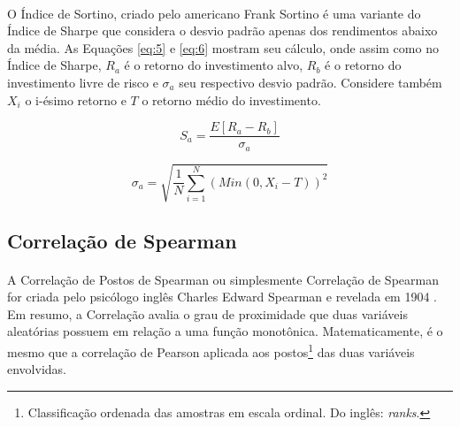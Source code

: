 \paragraph{} O Índice de Sortino, criado pelo americano Frank Sortino \cite{rollinger2013sortino} é uma variante do Índice de Sharpe que considera o desvio padrão apenas dos rendimentos abaixo da média. As Equações \ref{eq:5} e \ref{eq:6} mostram seu cálculo, onde assim como no Índice de Sharpe, \begin{math}R_a\end{math} é o retorno do investimento alvo, \begin{math}R_b\end{math} é o retorno do investimento livre de risco e \begin{math}\sigma_a\end{math} seu respectivo desvio padrão. Considere também \begin{math}X_i\end{math} o i-ésimo retorno e \begin{math}T\end{math} o retorno médio do investimento.

\begin{equation} \label{eq:5}
    S_a = \frac{E[R_a - R_b]}{\sigma_a}
\end{equation}

\begin{equation} \label{eq:6}
    \sigma_a = \sqrt{ \frac{1}{N} \sum_{i=1}^{N} (Min(0, X_i-T))^2}
\end{equation}



\FloatBarrier
\subsection{Correlação de Spearman}

\paragraph{} A Correlação de Postos de Spearman ou simplesmente Correlação de Spearman for criada pelo psicólogo inglês Charles Edward Spearman e revelada em 1904 \cite{spearman1961proof}. Em resumo, a Correlação avalia o grau de proximidade que duas variáveis aleatórias possuem em relação a uma função monotônica. Matematicamente, é o mesmo que a correlação de Pearson aplicada aos postos\footnote{Classificação ordenada das amostras em escala ordinal. Do inglês: \textit{ranks}.} das duas variáveis envolvidas.

